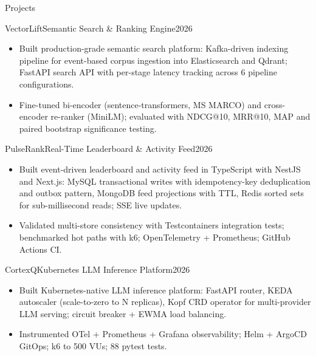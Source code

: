 \documentclass[]{mcdowellcv}
\begin{document}
\begin{cvsection}{Projects}
  \begin{cvsubsection}{VectorLift}{Semantic Search \& Ranking Engine}{2026}
    \begin{itemize}
      \item Built production-grade semantic search platform: Kafka-driven indexing pipeline for event-based corpus ingestion into Elasticsearch and Qdrant; FastAPI search API with per-stage latency tracking across 6 pipeline configurations.
      \item Fine-tuned bi-encoder (sentence-transformers, MS MARCO) and cross-encoder re-ranker (MiniLM); evaluated with NDCG@10, MRR@10, MAP and paired bootstrap significance testing.
    \end{itemize}
    \vspace{-1.5pt}
  \end{cvsubsection}

  \begin{cvsubsection}{PulseRank}{Real-Time Leaderboard \& Activity Feed}{2026}
    \begin{itemize}
      \item Built event-driven leaderboard and activity feed in TypeScript with NestJS and Next.js: MySQL transactional writes with idempotency-key deduplication and outbox pattern, MongoDB feed projections with TTL, Redis sorted sets for sub-millisecond reads; SSE live updates.
      \item Validated multi-store consistency with Testcontainers integration tests; benchmarked hot paths with k6; OpenTelemetry + Prometheus; GitHub Actions CI.
    \end{itemize}
    \vspace{-1.5pt}
  \end{cvsubsection}

  \begin{cvsubsection}{CortexQ}{Kubernetes LLM Inference Platform}{2026}
    \begin{itemize}
      \item Built Kubernetes-native LLM inference platform: FastAPI router, KEDA autoscaler (scale-to-zero to N replicas), Kopf CRD operator for multi-provider LLM serving; circuit breaker + EWMA load balancing.
      \item Instrumented OTel + Prometheus + Grafana observability; Helm + ArgoCD GitOps; k6 to 500 VUs; 88 pytest tests.
    \end{itemize}
  \end{cvsubsection}
\end{cvsection}
\end{document}
